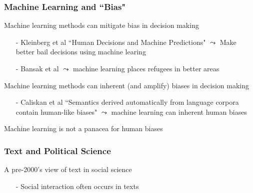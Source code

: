 \documentclass{beamer}
\numberwithin{equation}{section}
\begin{document}
\begin{frame}
\frametitle{Machine Learning and ``Bias"}

Machine learning methods can mitigate bias in decision making
\begin{itemize}
\item[-] Kleinberg et al ``Human Decisions and Machine Predictions" $\leadsto$ Make better bail decisions using machine learing
\item[-] Bansak et al $\leadsto$ machine learning places refugees in better areas
\end{itemize}

Machine learning methods can inherent (and amplify) biases in decision making
\begin{itemize}
\item[-] Caliskan et al ``Semantics derived automatically from language corpora contain human-like biases" $\leadsto$ machine learning can inherent human biases
\end{itemize}  

Machine learning is not a panacea for human biases


\end{frame}



\begin{frame}
\frametitle{Text and Political Science}

A pre-2000's view of text in social science
\begin{itemize}
\item[-] Social interaction often occurs in texts \pause
{} \pause
{} \pause
\begin{itemize}
 \pause
{} \pause
{} \pause
{} \pause
{} \pause
{}
\end{itemize}
\end{itemize}

\end{frame}
\end{document}
